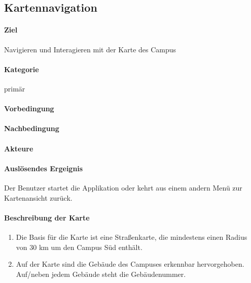 \subsection{Kartennavigation}
\label{Kartennavigation}
\paragraph{Ziel}
Navigieren und Interagieren mit der Karte des Campus
\paragraph{Kategorie}
primär
\paragraph{Vorbedingung}

\paragraph{Nachbedingung}

\paragraph{Akteure}

\paragraph{Auslösendes Ergeignis}
Der Benutzer startet die Applikation oder kehrt aus einem andern Menü zur Kartenansicht zurück.
\paragraph{Beschreibung der Karte}
\begin{enumerate}
    \item Die Basis für die Karte ist eine Straßenkarte, die mindestens einen Radius von 30 km um den Campus Süd enthält.
    \item Auf der Karte sind die Gebäude des Campuses erkennbar hervorgehoben. Auf/neben jedem Gebäude steht die Gebäudenummer.
\end{enumerate}
